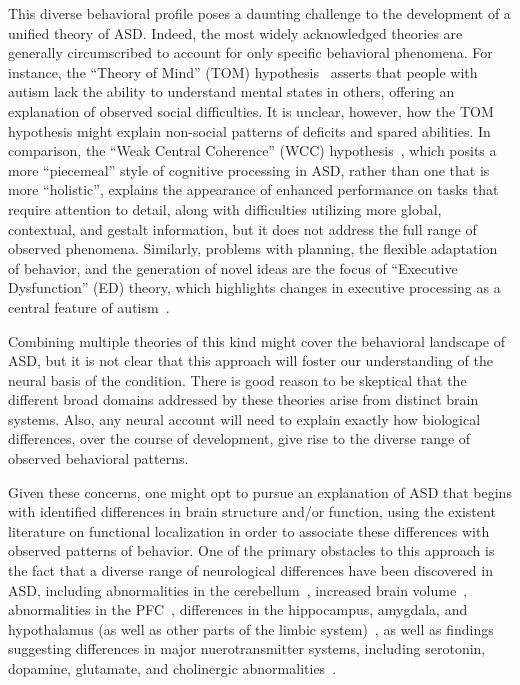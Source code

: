 This diverse behavioral profile poses a daunting challenge to the development of a unified theory of ASD. Indeed, the most widely acknowledged theories are generally circumscribed to account for only specific behavioral phenomena. For instance, the ``Theory of Mind'' (TOM) hypothesis~\cite{Baron-Cohen:1985:AutismTOM} asserts that people with autism lack the ability to understand mental states in others, offering an explanation of observed social difficulties. It is unclear, however, how the TOM hypothesis might explain non-social patterns of deficits and spared abilities. In comparison, the ``Weak Central Coherence'' (WCC) hypothesis~\cite{HappeF:1999:WCC}, which posits a more ``piecemeal'' style of cognitive processing in ASD, rather than one that is more ``holistic'', explains the appearance of enhanced performance on tasks that require attention to detail, along with difficulties utilizing more global, contextual, and gestalt information, but it does not address the full range of observed phenomena. Similarly, problems with planning, the flexible adaptation of behavior, and the generation of novel ideas are the focus of ``Executive Dysfunction'' (ED) theory, which highlights changes in executive processing as a central feature of autism~\cite{HughesC:1994:AutismExecutiveDysfunction,HillEL:2004:AutismExecutiveDysfunction}.  

Combining multiple theories of this kind might cover the behavioral landscape of ASD, but it is not clear that this approach will foster our understanding of the neural basis of the condition. There is good reason to be skeptical that the different broad domains addressed by these theories arise from distinct brain systems. Also, any neural account will need to explain exactly how biological differences, over the course of development, give rise to the diverse range of observed behavioral patterns.

Given these concerns, one might opt to pursue an explanation of ASD that begins with identified differences in brain structure and/or function, using the existent literature on functional localization in order to associate these differences with observed patterns of behavior. One of the primary obstacles to this approach is the fact that a diverse range of neurological differences have been discovered in ASD, including abnormalities in the cerebellum~\cite{RodierPM:1996:AutismCerebellum}, increased brain volume~\cite{AylwardEH:2002:BrainVolume}, abnormalities in the PFC~\cite{CasanovaMF:2003:AutismMiniColumns}, differences in the hippocampus, amygdala, and hypothalamus (as well as other parts of the limbic system)~\cite{KemperTL:1998:ASDNeuropathology}, as well as findings suggesting differences in major nuerotransmitter systems, including serotonin, dopamine, glutamate, and cholinergic abnormalities~\cite{CarlssonML:1998:Glutamate,RubensteinJLR:2003:EI,PerryEK:2001:Cholinergic,MartineauJ:1992:AutismDopamine,TsaiLY:1999:AutismDopamine}.

